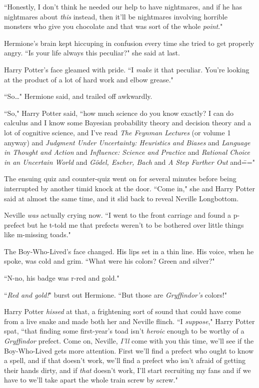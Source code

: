 ``Honestly, I don't think he needed our help to have nightmares, and if he has nightmares about \emph{this} instead, then it'll be nightmares involving horrible monsters who give you chocolate and that was sort of the whole \emph{point}."

Hermione's brain kept hiccuping in confusion every time she tried to get properly angry. ``Is your life always this peculiar?" she said at last.

Harry Potter's face gleamed with pride. ``I \emph{make} it that peculiar. You're looking at the product of a lot of hard work and elbow grease."

``So{\ldots}" Hermione said, and trailed off awkwardly.

``So," Harry Potter said, ``how much science do you know exactly? I can do calculus and I know some Bayesian probability theory and decision theory and a lot of cognitive science, and I've read \emph{The Feynman Lectures} (or volume 1 anyway) and \emph{Judgment Under Uncertainty: Heuristics and Biases} and \emph{Language in Thought and Action} and \emph{Influence: Science and Practice} and \emph{Rational Choice in an Uncertain World} and \emph{Gödel, Escher, Bach} and \emph{A Step Farther Out} and\==="

The ensuing quiz and counter-quiz went on for several minutes before being interrupted by another timid knock at the door. ``Come in," she and Harry Potter said at almost the same time, and it slid back to reveal Neville Longbottom.

Neville \emph{was} actually crying now. ``I went to the front carriage and found a p-prefect but he t-told me that prefects weren't to be bothered over little things like m-missing toads."

The Boy-Who-Lived's face changed. His lips set in a thin line. His voice, when he spoke, was cold and grim. ``What were his colors? Green and silver?"

``N-no, his badge was r-red and gold."

``\emph{Red and gold!}" burst out Hermione. ``But those are \emph{Gryffindor's} colors!"

Harry Potter \emph{hissed} at that, a frightening sort of sound that could have come from a live snake and made both her and Neville flinch. ``I \emph{suppose}," Harry Potter spat, ``that finding some first-year's toad isn't \emph{heroic} enough to be worthy of a \emph{Gryffindor} prefect. Come on, Neville, \emph{I'll} come with you this time, we'll see if the Boy-Who-Lived gets more attention. First we'll find a prefect who ought to know a spell, and if that doesn't work, we'll find a prefect who isn't afraid of getting their hands dirty, and if \emph{that} doesn't work, I'll start recruiting my fans and if we have to we'll take apart the whole train screw by screw."

